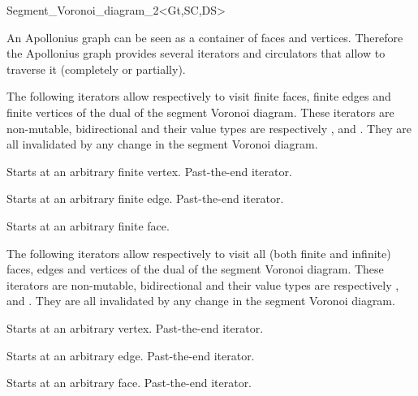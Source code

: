 \begin{ccRefClass}{Segment_Voronoi_diagram_2<Gt,SC,DS>}


An Apollonius graph can be seen as a container of faces and vertices.
Therefore the Apollonius graph provides several iterators and circulators
that allow to traverse it (completely or partially).





The following iterators allow respectively to visit 
finite faces,  finite edges and  finite vertices of the dual of the
segment Voronoi diagram. These iterators are non-mutable,
bidirectional and their value types are respectively
,  and . 
They are all invalidated by any change in the segment Voronoi diagram.

{Starts at an arbitrary finite vertex.}
\ccGlue
{}
{Past-the-end iterator.}

{Starts at an arbitrary finite edge.}
\ccGlue
{}
{Past-the-end iterator.}

{Starts at an arbitrary finite face.}
\ccGlue
{}

The following iterators allow respectively to visit all
(both finite and infinite) faces, edges and vertices
of the dual of the segment Voronoi diagram. These iterators are
non-mutable, bidirectional and their value types are respectively
,  and . 
They are all invalidated by any change in the segment Voronoi diagram.


{Starts at an arbitrary  vertex.}
\ccGlue
{}
{Past-the-end iterator.}

{Starts at an arbitrary edge.}
\ccGlue
{}
{Past-the-end iterator.}

{Starts at an arbitrary face.}
\ccGlue
{}
{Past-the-end iterator.}




\end{ccRefClass}
